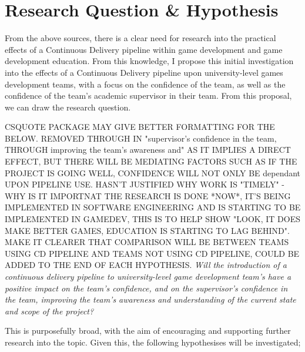 \documentclass[journal]{IEEEtran}
\begin{document}

\section{Research Question \& Hypothesis}
From the above sources, there is a clear need for research into the practical effects of a Continuous Delivery pipeline within game development and game development education. From this knowledge, I propose this initial investigation into the effects of a Continuous Delivery pipeline upon university-level games development teams, with a focus on the confidence of the team, as well as the confidence of the team's academic supervisor in their team.
From this proposal, we can draw the research question.

CSQUOTE PACKAGE MAY GIVE BETTER FORMATTING FOR THE BELOW. REMOVED THROUGH IN "supervisor's confidence in the team, THROUGH improving the team's awareness and" AS IT IMPLIES A DIRECT EFFECT, BUT THERE WILL BE MEDIATING FACTORS SUCH AS IF THE PROJECT IS GOING WELL, CONFIDENCE WILL NOT ONLY BE dependant UPON PIPELINE USE. HASN'T JUSTIFIED WHY WORK IS "TIMELY" - WHY IS IT IMPORTNAT THE RESEARCH IS DONE *NOW*, IT'S BEING IMPLEMENTED IN SOFTWARE ENGINEERING AND IS STARTING TO BE IMPLEMENTED IN GAMEDEV, THIS IS TO HELP SHOW "LOOK, IT DOES MAKE BETTER GAMES, EDUCATION IS STARTING TO LAG BEHIND". MAKE IT CLEARER THAT COMPARISON WILL BE BETWEEN TEAMS USING CD PIPELINE AND TEAMS NOT USING CD PIPELINE, COULD BE ADDED TO THE END OF EACH HYPOTHESIS.
\textit{Will the introduction of a continuous delivery pipeline to university-level game development team's have a positive impact on the team's confidence, and on the supervisor's confidence in the team, improving the team's awareness and understanding of the current state and scope of the project?}

This is purposefully broad, with the aim of encouraging and supporting further research into the topic. Given this, the following hypothesises will be investigated;
\end{document}
